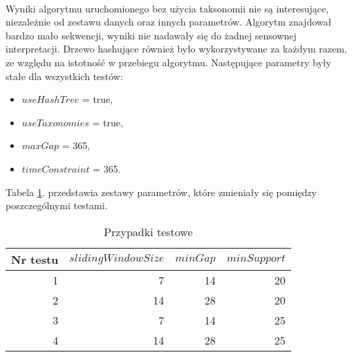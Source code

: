 \documentclass[11pt,a4paper]{article}
\begin{document}
\paragraph{} Wyniki algorytmu uruchomionego bez użycia taksonomii nie są interesujące, niezależnie od zestawu danych oraz innych parametrów. Algorytm znajdował bardzo mało sekwencji, wyniki nie nadawały się do żadnej sensownej interpretacji. Drzewo hashujące również było wykorzystywane za każdym razem, ze względu na istotność w przebiegu algorytmu. Następujące parametry były stałe dla wszystkich testów:
\begin{itemize}
\item $useHashTree$ = true,
\item $useTaxonomies$ = true,
\item $maxGap$ = 365,
\item $timeConstraint$ = 365.
\end{itemize}

Tabela \ref{tab:1}. przedstawia zestawy parametrów, które zmieniały się pomiędzy poszczególnymi testami.
\begin{table}[!hbt]
\caption{Przypadki testowe}
\centering
\begin{tabular}{|r|r|r|r|}
\hline
Nr testu	& $slidingWindowSize$	& $minGap$	& $minSupport$	\\[1.2ex]\hline
1			& 7						& 14		& 20			\\[1ex]\hline
2			& 14					& 28		& 20			\\[1ex]\hline
3			& 7						& 14		& 25			\\[1ex]\hline
4			& 14					& 28		& 25			\\[1ex]\hline
\end{tabular}
\label{tab:1}
\end{table}
\end{document}
